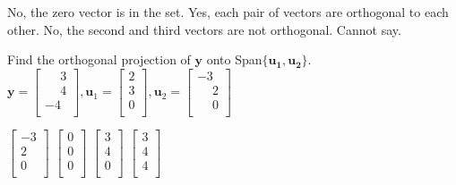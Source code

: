 \documentclass[11pt]{exam}
\begin{document}
\begin{questions}
\begin{choices}
\choice No, the zero vector is in the set.
\choice Yes, each pair of vectors are orthogonal to each other. %
\choice No, the second and third vectors are not orthogonal.
\choice Cannot say.
\end{choices}
\answerline

\addpoints
\question[2]
Find the orthogonal projection of $\mathbf{y}$ onto Span$\{\mathbf{u_{1},u_{2}}\}$.\newline
$\mathbf{y} = \left[\begin{array}{c} \phantom{-}3 \\ \phantom{-}4 \\ -4 \\ \end{array}\right], \mathbf{u}_{1} = \left[\begin{array}{c} 2 \\ 3 \\ 0 \\ \end{array}\right], \mathbf{u}_{2}= \left[\begin{array}{c} -3 \\ \phantom{-}2 \\ \phantom{-}0 \\ \end{array}\right]$

\begin{oneparchoices}
\choice $\left[\begin{array}{c} -3 \\ 2 \\ 0 \\ \end{array}\right]$
\choice $\left[\begin{array}{c} 0 \\ 0 \\ 0 \\ \end{array}\right]$
\choice $\left[\begin{array}{c} 3 \\ 4 \\ 0 \\ \end{array}\right]$ %
\choice $\left[\begin{array}{c} 3 \\ 4 \\ 4 \\ \end{array}\right]$
\end{oneparchoices}
\answerline


\end{questions}
\end{document}
